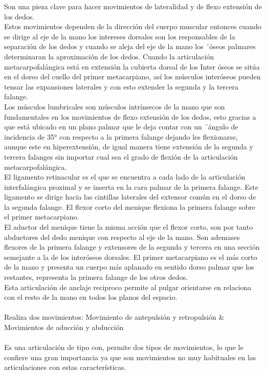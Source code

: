 \documentclass{article}
\begin{document}
Son una pieza clave para hacer movimientos de lateralidad y de flexo extensión de los dedos.\\
Estos movimientos dependen de la dirección del cuerpo muscular entonces cuando se dirige al eje de la mano los intereses dorsales son los responsables de la separación de los dedos y cuando se aleja del eje de la mano los ´óseos palmares determinaran la aproximación de los dedos.
Cuando la articulación metacarpofalángica está en extensión la cubierta dorsal de los Inter óseos se sitúa en el dorso del cuello del primer metacarpiano, así los músculos interóseos pueden tensar las expansiones laterales y con esto extender la segunda y la tercera falange.\\
Los músculos lumbricales son músculos intrínsecos de la mano que son fundamentales en los movimientos de flexo extensión de los dedos, esto gracias a que está ubicado en un plano palmar que le deja contar con un ´ángulo de incidencia de 35° con respecto a la primera falange dejando les flexionarse, aunque este en hiperextensión, de igual manera tiene extensión de la segunda y tercera falanges sin importar cual sea el grado de flexión de la articulación metacarpofalángica.\\
El ligamento retinacular es el que se encuentra a cada lado de la articulación interfalángica proximal y se inserta en la cara palmar de la primera falange.
Este ligamento se dirige hacia las cintillas laterales del extensor común en el dorso de la segunda falange.
El flexor corto del menique flexiona la primera falange sobre el primer metacarpiano.\\
El aductor del menique tiene la misma acción que el flexor corto, son por tanto abductores del dedo menique con respecto al eje de la mano.
Son ademases flexores de la primera falange y extensores de la segunda y tercera en una sección semejante a la de los interóseos dorsales.
El primer metacarpiano es el más corto de la mano y presenta un cuerpo más aplanado en sentido dorso palmar que los restantes, representa la primera falange de los otros dedos.\\
Esta articulación de anclaje reciproco permite al pulgar orientarse en relaciona con el resto de la mano en todos los planos del espacio.
\\\\
Realiza dos movimientos: Movimiento de antepulsión y retropulsión & Movimientos de aducción y abducción
\\\\
Es una articulación de tipo con, permite dos tipos de movimientos, lo que le confiere una gran importancia ya que son movimientos no muy habituales en las articulaciones con estas características.
\end{document}
